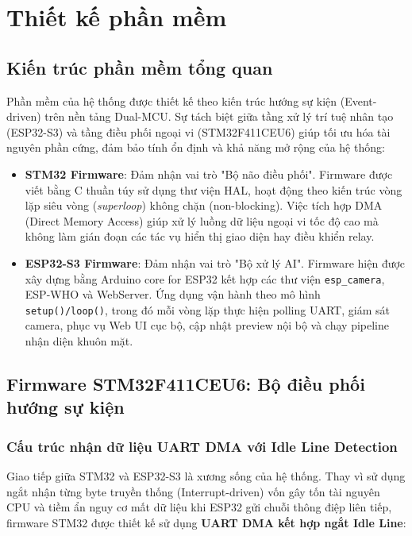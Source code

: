 \chapter{Thiết kế phần mềm}
\label{chap:software}

\section{Kiến trúc phần mềm tổng quan}
\label{sec:sw_architecture}

Phần mềm của hệ thống được thiết kế theo kiến trúc hướng sự kiện (Event-driven) trên nền tảng Dual-MCU. Sự tách biệt giữa tầng xử lý trí tuệ nhân tạo (ESP32-S3) và tầng điều phối ngoại vi (STM32F411CEU6) giúp tối ưu hóa tài nguyên phần cứng, đảm bảo tính ổn định và khả năng mở rộng của hệ thống:

\begin{itemize}
  \item \textbf{STM32 Firmware}: Đảm nhận vai trò "Bộ não điều phối". Firmware được viết bằng C thuần túy sử dụng thư viện HAL, hoạt động theo kiến trúc vòng lặp siêu vòng (\textit{superloop}) không chặn (non-blocking). Việc tích hợp DMA (Direct Memory Access) giúp xử lý luồng dữ liệu ngoại vi tốc độ cao mà không làm gián đoạn các tác vụ hiển thị giao diện hay điều khiển relay.
  \item \textbf{ESP32-S3 Firmware}: Đảm nhận vai trò "Bộ xử lý AI". Firmware hiện được xây dựng bằng Arduino core for ESP32 kết hợp các thư viện \texttt{esp\_camera}, ESP-WHO và WebServer. Ứng dụng vận hành theo mô hình \texttt{setup()/loop()}, trong đó mỗi vòng lặp thực hiện polling UART, giám sát camera, phục vụ Web UI cục bộ, cập nhật preview nội bộ và chạy pipeline nhận diện khuôn mặt.
\end{itemize}

\section{Firmware STM32F411CEU6: Bộ điều phối hướng sự kiện}
\label{sec:stm32_fw}

\subsection{Cấu trúc nhận dữ liệu UART DMA với Idle Line Detection}

Giao tiếp giữa STM32 và ESP32-S3 là xương sống của hệ thống. Thay vì sử dụng ngắt nhận từng byte truyền thống (Interrupt-driven) vốn gây tốn tài nguyên CPU và tiềm ẩn nguy cơ mất dữ liệu khi ESP32 gửi chuỗi thông điệp liên tiếp, firmware STM32 được thiết kế sử dụng \textbf{UART DMA kết hợp ngắt Idle Line}:

